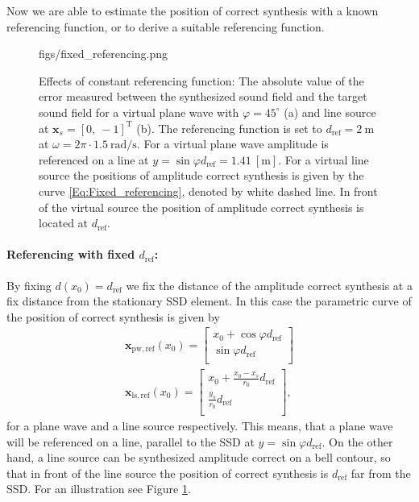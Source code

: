 \documentclass[12pt,a4paper]{article}
\newcommand{\sinfi}{\sin\varphi}
\newcommand{\cosfi}{\cos\varphi}
\newcommand{\dref}{d_{\mathrm{ref}}}
\begin{document}
Now we are able to estimate the position of correct synthesis with a known referencing function, or to derive a suitable referencing function.

\begin{figure}
	\centering
	\begin{overpic}[width = 1\columnwidth ]{figs/fixed_referencing.png}
	\scriptsize
	\end{overpic}
\caption{ Effects of constant referencing function: The absolute value of the error measured between the synthesized sound field and the target sound field for a virtual plane wave with $\varphi = 45^{\circ}$ (a) and line source at $\mathbf{x}_s = [0,\ -1]^{\mathrm{T}}$ (b). The referencing function is set to $\dref = 2~\mathrm{m}$ at $\omega = 2\pi\cdot 1.5~\mathrm{rad/s}$. For a virtual plane wave amplitude is referenced on a line at $y = \sinfi \dref = 1.41~[\mathrm{m}]$. For a virtual line source the positions of amplitude correct synthesis is given by the curve \eqref{Eq:Fixed_referencing}, denoted by white dashed line. In front of the virtual source the position of amplitude correct synthesis is located at $\dref$. }
	\label{Fig:Theory:fixed_referencing}
\end{figure}
\paragraph{Referencing with fixed $\dref$:\\}
By fixing $d(x_0) = \dref$ we fix the distance of the amplitude correct synthesis at a fix distance from the stationary SSD element. In this case the parametric curve of the position of correct synthesis is given by
\begin{eqnarray}
\mathbf{x}_{\mathrm{pw, ref}}(x_0) =  \begin{bmatrix} x_0 + \cosfi \dref \\[0.3em] \sinfi \dref \\[0.3em]    \end{bmatrix} \\
\mathbf{x}_{\mathrm{ls, ref}}(x_0) =  \begin{bmatrix} x_0 + \frac{x_0-x_s}{r_0} \dref \\[0.3em] \frac{y_s}{r_0} \dref \\[0.3em]    \end{bmatrix},
\label{Eq:Fixed_referencing}
\end{eqnarray}
for a plane wave and a line source respectively. This means, that a plane wave will be referenced on a line, parallel to the SSD at $y = \sinfi \dref$. On the other hand, a line source can be synthesized amplitude correct on a bell contour, so that in front of the line source the position of correct synthesis is $\dref$ far from the SSD. For an illustration see Figure \ref{Fig:Theory:fixed_referencing}.
\end{document}
